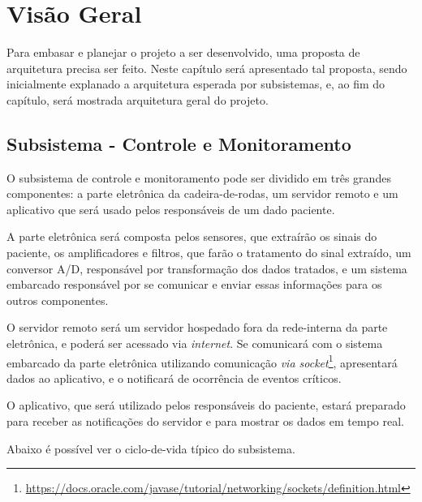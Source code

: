\chapter{Visão Geral}

Para embasar e planejar o projeto a ser desenvolvido, uma proposta de
arquitetura precisa ser feito. Neste capítulo será apresentado tal proposta,
sendo inicialmente explanado a arquitetura esperada por subsistemas, e, ao fim
do capítulo, será mostrada arquitetura geral do projeto.

\section{Subsistema - Controle e Monitoramento}

O subsistema de controle e monitoramento pode ser dividido em três grandes
componentes: a parte eletrônica da cadeira-de-rodas, um servidor remoto e um
aplicativo que será usado pelos responsáveis de um dado paciente.

A parte eletrônica será composta pelos sensores, que extraírão os sinais do
paciente, os amplificadores e filtros, que farão o tratamento do sinal
extraído, um conversor A/D, responsável por transformação dos dados tratados,
e um sistema embarcado responsável por se comunicar e enviar essas informações
para os outros componentes.

O servidor remoto será um servidor hospedado fora da rede-interna da parte
eletrônica, e poderá ser acessado via \textit{internet}. Se comunicará com
o sistema embarcado da parte eletrônica utilizando comunicação
\textit{via socket}\footnote{\url{https://docs.oracle.com/javase/tutorial/networking/sockets/definition.html}},
apresentará dados ao aplicativo, e o notificará de ocorrência de eventos
críticos.

O aplicativo, que será utilizado pelos responsáveis do paciente, estará
preparado para receber as notificações do servidor e para mostrar os dados em
tempo real.

Abaixo é possível ver o ciclo-de-vida típico do subsistema.

